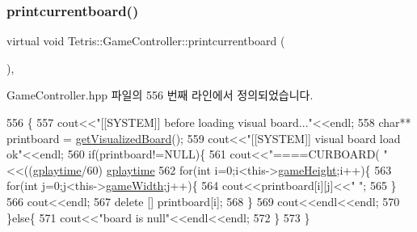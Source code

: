 \subsubsection{\texorpdfstring{printcurrentboard()}{printcurrentboard()}\hspace{0.1cm}{\footnotesize\ttfamily [2/2]}}
{\footnotesize\ttfamily virtual void Tetris\+::\+Game\+Controller\+::printcurrentboard (\begin{DoxyParamCaption}{ }\end{DoxyParamCaption})\hspace{0.3cm}{\ttfamily [inline]}, {\ttfamily [virtual]}}



Game\+Controller.\+hpp 파일의 556 번째 라인에서 정의되었습니다.


\begin{DoxyCode}
556                                             \{
557                 cout<<\textcolor{stringliteral}{"[[SYSTEM]] before loading visual board..."}<<endl;
558                 \textcolor{keywordtype}{char}** printboard = \hyperlink{class_tetris_1_1_game_controller_a78b39bdb39707e119d6e708bdb2aca17}{getVisualizedBoard}();
559                 cout<<\textcolor{stringliteral}{"[[SYSTEM]] visual board load ok"}<<endl;
560                 \textcolor{keywordflow}{if}(printboard!=NULL)\{
561                 cout<<\textcolor{stringliteral}{"====CURBOARD( "}<<((\hyperlink{class_tetris_1_1_game_controller_a562adcade20e362160535cd7248a2cce}{gplaytime}/60)%
      \hyperlink{class_tetris_1_1_game_controller_a562adcade20e362160535cd7248a2cce}{gplaytime}%
562                     \textcolor{keywordflow}{for}(\textcolor{keywordtype}{int} i=0;i<this->\hyperlink{class_tetris_1_1_game_controller_a8e3adc647ed382de0ff541417bea9b33}{gameHeight};i++)\{
563                         \textcolor{keywordflow}{for}(\textcolor{keywordtype}{int} j=0;j<this->\hyperlink{class_tetris_1_1_game_controller_a439f215918db4127fcb44cf9d501ed63}{gameWidth};j++)\{
564                             cout<<printboard[i][j]<<\textcolor{stringliteral}{" "};
565                         \}
566                         cout<<endl;
567                         \textcolor{keyword}{delete} [] printboard[i];
568                     \}
569                     cout<<endl<<endl;
570                 \}\textcolor{keywordflow}{else}\{
571                     cout<<\textcolor{stringliteral}{"board is null"}<<endl<<endl;
572                 \}
573             \}
\end{DoxyCode}
\mbox{\label{class_tetris_1_1_game_controller_a269da7d33475ae2f327ee9a51f02ef52}} 
